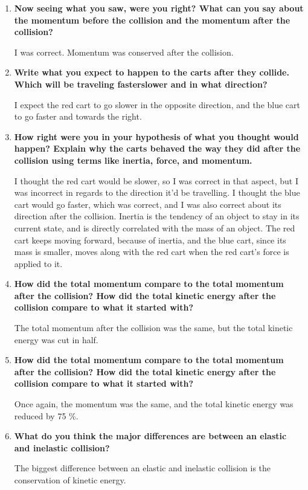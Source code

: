 \begin{enumerate}
\item \textbf{Now seeing what you saw, were you right? What can you say about the momentum before the collision and the momentum after the collision?}

I was correct. Momentum was conserved after the collision. 


\item \textbf{Write what you expect to happen to the carts after they collide. Which will be traveling faster\/slower and in what direction?}

I expect the red cart to go slower in the opposite direction, and the blue cart to go faster and towards the right.
	
\item \textbf{How right were you in your hypothesis of what you thought would happen? Explain why the carts behaved the way they did after the collision using terms like inertia, force, and momentum.}

I thought the red cart would be slower, so I was correct in that aspect, but I was incorrect in regards to the direction it'd be travelling. I thought the blue cart would go faster, which was correct, and I was also correct about its direction after the collision. Inertia is the tendency of an object to stay in its current state, and is directly correlated with the mass of an object. The red cart keeps moving forward, because of inertia, and the blue cart, since its mass is smaller, moves along with the red cart when the red cart's force is applied to it.
	

\item \textbf{How did the total momentum compare to the total momentum after the collision? How did the total kinetic energy after the collision compare to what it started with?}

The total momentum after the collision was the same, but the total kinetic energy was cut in half.
	
\item \textbf{How did the total momentum compare to the total momentum after the collision? How did the total kinetic energy after the collision compare to what it started with?}

Once again, the momentum was the same, and the total kinetic energy was reduced by 75 \%.

\item \textbf{What do you think the major differences are between an elastic and inelastic collision?}

The biggest difference between an elastic and inelastic collision is the conservation of kinetic energy. 


\end{enumerate}
